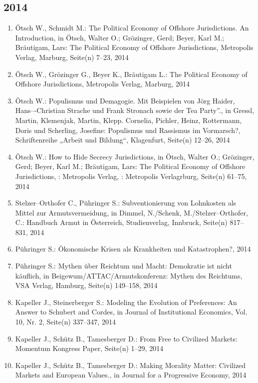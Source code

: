 \subsection*{2014}
\begin{enumerate}
    	 \item Ötsch W., Schmidt M.: The Political Economy of Offshore Jurisdictions. An Introduction, in Ötsch, Walter O.; Grözinger, Gerd; Beyer, Karl M.; Bräutigam, Lars: The Political Economy of Offshore Jurisdictions, Metropolis Verlag, Marburg, Seite(n) 7--23, 2014
	 \item Ötsch W., Grözinger G., Beyer K., Bräutigam L.: The Political Economy of Offshore Jurisdictions, Metropolis Verlag, Marburg, 2014
	 \item Ötsch W.: Populismus und Demagogie. Mit Beispielen von Jörg Haider, Hans--­‐Christian Strache und Frank Stronach sowie der Tea Party”., in Gressl, Martin, Klemenjak, Martin, Klepp. Cornelia, Pichler, Heinz, Rottermann, Doris und Scherling, Josefine: Populismus und Rassismus im Vormarsch?, Schriftenreihe „Arbeit und Bildung“, Klagenfurt, Seite(n) 12--26, 2014
	 \item Ötsch W.: How to Hide Secrecy Jurisdictions, in Ötsch, Walter O.; Grözinger, Gerd; Beyer, Karl M.; Bräutigam, Lars: The Political Economy of Offshore Jurisdictions, : Metropolis Verlag, : Metropolis Verlagrburg, Seite(n) 61--75, 2014
	 \item Stelzer--Orthofer C., Pühringer S.: Subventionierung von Lohnkosten als Mittel zur Armutsvermeidung, in Dimmel, N./Schenk, M./Stelzer--Orthofer, C.: Handbuch Armut in Österreich, Studienverlag, Innbruck, Seite(n) 817--831, 2014
	 \item Pühringer S.: Ökonomische Krisen als Krankheiten und Katastrophen?, 2014
	 \item Pühringer S.: Mythen über Reichtum und Macht: Demokratie ist nicht käuflich, in Beigewum/ATTAC/Armutskonferenz: Mythen des Reichtums, VSA Verlag, Hamburg, Seite(n) 149--158, 2014
	 \item Kapeller J., Steinerberger S.: Modeling the Evolution of Preferences: An Answer to Schubert and Cordes, in Journal of Institutional Economics, Vol. 10, Nr. 2, Seite(n) 337--347, 2014
	 \item Kapeller J., Schütz B., Tamesberger D.: From Free to Civilized Markets: Momentum Kongress Paper, Seite(n) 1--29, 2014
	 \item Kapeller J., Schütz B., Tamesberger D.: Making Morality Matter: Civilized Markets and European Values., in Journal for a Progressive Economy, 2014

\end{enumerate}
